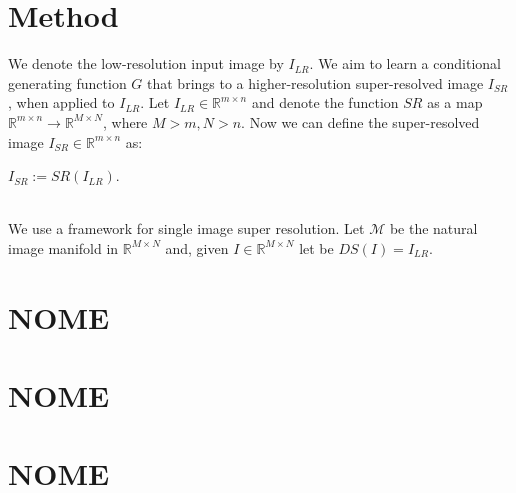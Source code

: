 \documentclass[12pt]{article}
\begin{document}

\section{Method}
	We denote the low-resolution input image by $I_{LR}$. We aim to learn a conditional generating function $G$
	that brings to a higher-resolution super-resolved image $I_{SR}$, when applied to $I_{LR}$. 
	Let $I_{LR} \in \mathbb{R}^{m \times n}$ and denote the function $SR$ as a map $\mathbb{R}^{m \times n} \rightarrow \mathbb{R}^{M \times N}$, where $M > m, N > n$.
	Now we can define the super-resolved image $I_{SR} \in \mathbb{R}^{m \times n}$ as:\\
	\centerline{$I_{SR} := SR(I_{LR}).$}\\
	We use a framework for single image super resolution. Let $\mathcal{M}$ be the natural image manifold in $\mathbb{R}^{M \times N}$ and,
	given $I \in \mathbb{R}^{M \times N}$ let be
	$DS(I) = I_{LR}$.



\newpage
\pagestyle{fancy}
\fancyhf{}

\section*{NOME}


\newpage
\pagestyle{fancy}
\fancyhf{}

\section*{NOME}


\newpage
\pagestyle{fancy}
\fancyhf{}

\section*{NOME}

\end{document}
